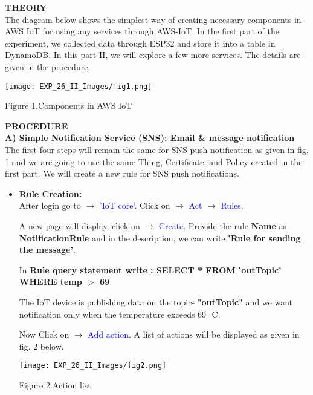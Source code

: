 \documentclass[12pt,a4paper]{article}
\begin{document}
\begin{justify}
\textbf{\large THEORY}\\[3pt]
The diagram below shows the simplest way of creating necessary components in AWS IoT for using any services through AWS-IoT. In the first part of the experiment, we collected data through ESP32 and store it into a table in DynamoDB. In this part-II, we will explore a few more services. The details are given in the procedure.
\begin{center} 
\texttt{[image: EXP\_26\_II\_Images/fig1.png]}
\end{center}
\vspace{-10mm}
\begin{center} {Figure 1.Components in AWS IoT}\end{center}

\noindent \textbf{\large PROCEDURE}\\[6pt]
\textbf{A)	Simple Notification Service (SNS): Email \& message notification}\\[3pt]
The first four steps will remain the same for SNS push notification as given in fig. 1 and we are going to use the same Thing, Certificate, and Policy created in the first part. We will create a new rule for SNS push notifications.


\begin{itemize}
 \setlength\itemsep{-0.3em}
\item \textbf {Rule Creation:}\\
After login go to $ \rightarrow $ \textcolor{blue}{'IoT core'}. Click on $ \rightarrow $ \textcolor{blue}{Act} $ \rightarrow $ \textcolor{blue}{Rules}.

A new page will display, click on $ \rightarrow $ \textcolor{blue}{Create}. Provide the rule \textbf{Name} as \textbf{NotificationRule} and in the description, we can write \textbf{'Rule for sending the message'}.\par

In \textbf{ Rule query statement write :  SELECT * FROM 'outTopic' WHERE  temp $>$ 69}\par

The IoT device is publishing data on the topic- \textbf{"outTopic"} and we want notification only when the temperature exceeds 69$^{\circ}$ C.

Now Click on $ \rightarrow $ \textcolor{blue}{Add action}. A list of actions will be displayed as given in fig. 2 below.


\vspace{-5mm}
\begin{center} 
\texttt{[image: EXP\_26\_II\_Images/fig2.png]}
\end{center}
\vspace{-10mm}
\begin{center} {Figure 2.Action list}\end{center}


\end{itemize}
\end{justify}
\end{document}
